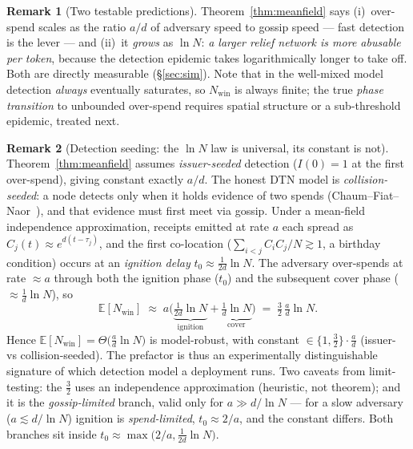 \documentclass[11pt]{article}
\theoremstyle{plain}
\theoremstyle{definition}
\newtheorem{remark}{Remark}
\newcommand{\Nwin}{N_{\mathrm{win}}}
\newcommand{\E}{\mathbb{E}}
\begin{document}
\begin{remark}[Two testable predictions]
Theorem~\ref{thm:meanfield} says (i)~over-spend scales as the ratio $a/d$ of
adversary speed to gossip speed --- fast detection is the lever --- and (ii)~it
\emph{grows} as $\ln N$: \emph{a larger relief network is more abusable per token},
because the detection epidemic takes logarithmically longer to take off. Both are
directly measurable (\S\ref{sec:sim}). Note that in the well-mixed model detection
\emph{always} eventually saturates, so $\Nwin$ is always finite; the true
\emph{phase transition} to unbounded over-spend requires spatial structure or a
sub-threshold epidemic, treated next.
\end{remark}

\begin{remark}[Detection seeding: the $\ln N$ law is universal, its constant is not]
\label{rem:seeding}
Theorem~\ref{thm:meanfield} assumes \emph{issuer-seeded} detection ($I(0)=1$ at
the first over-spend), giving constant exactly $a/d$. The honest DTN model is
\emph{collision-seeded}: a node detects only when it holds evidence of two spends
(Chaum--Fiat--Naor~\cite{ChaumFiatNaor1988}), and that evidence must first meet via
gossip. Under a mean-field independence approximation, receipts emitted at rate $a$
each spread as $C_j(t)\approx e^{d(t-\tau_j)}$, and the first co-location
($\sum_{i<j}C_iC_j/N \gtrsim 1$, a birthday condition) occurs at an
\emph{ignition delay} $t_0 \approx \tfrac{1}{2d}\ln N$. The adversary over-spends
at rate $\approx a$ through both the ignition phase ($t_0$) and the subsequent
cover phase ($\approx \tfrac{1}{d}\ln N$), so
\[
\E[\Nwin]\;\approx\; a\Big(\underbrace{\tfrac{1}{2d}\ln N}_{\text{ignition}}+\underbrace{\tfrac{1}{d}\ln N}_{\text{cover}}\Big)\;=\;\tfrac{3}{2}\,\tfrac{a}{d}\ln N.
\]
Hence $\E[\Nwin]=\Theta\!\big(\tfrac{a}{d}\ln N\big)$ is model-robust, with constant
$\in\{1,\tfrac32\}\cdot\tfrac{a}{d}$ (issuer- vs collision-seeded). The prefactor is
thus an experimentally distinguishable signature of which detection model a
deployment runs. Two caveats from limit-testing: the $\tfrac32$ uses an
independence approximation (heuristic, not theorem); and it is the
\emph{gossip-limited} branch, valid only for $a\gg d/\ln N$ --- for a slow adversary
($a\lesssim d/\ln N$) ignition is \emph{spend-limited}, $t_0\approx 2/a$, and the
constant differs. Both branches sit inside $t_0\approx\max\!\big(2/a,\tfrac{1}{2d}\ln N\big)$.
\end{remark}

\end{document}
